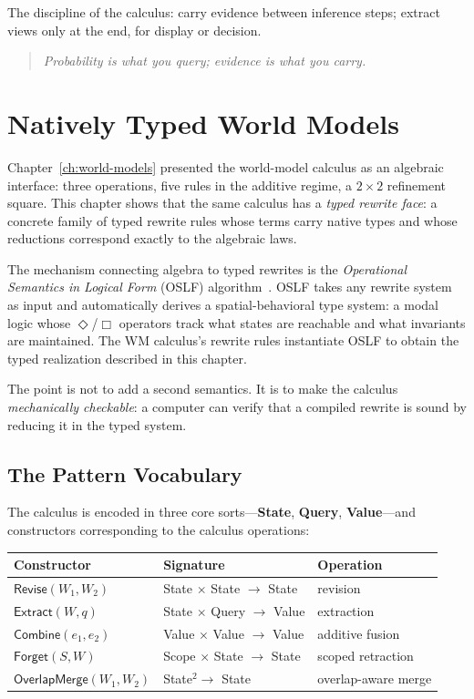 \documentclass[11pt,openany]{report}
\begin{document}
The discipline of the calculus: carry evidence between inference
steps; extract views only at the end, for display or decision.

\begin{quote}
\emph{Probability is what you query; evidence is what you carry.}
\end{quote}


\chapter{Natively Typed World Models}
\label{ch:typed}

Chapter~\ref{ch:world-models} presented the world-model calculus as
an algebraic interface: three operations, five rules in the additive
regime, a $2 \times 2$ refinement square.  This chapter shows that the
same calculus has a \emph{typed rewrite face}: a concrete family of
typed rewrite rules whose terms carry native types and whose reductions
correspond exactly to the algebraic laws.

The mechanism connecting algebra to typed rewrites is the
\emph{Operational Semantics in Logical Form} (OSLF)
algorithm~\cite{MeredithStayOSLF2020,leanOSLF2025}.  OSLF takes any
rewrite system as input and automatically derives a spatial-behavioral
type system: a modal logic whose $\Diamond$/$\Box$ operators track
what states are reachable and what invariants are maintained.  The
WM calculus's rewrite rules instantiate OSLF to obtain the typed
realization described in this chapter.

The point is not to add a second semantics.  It is to make the
calculus \emph{mechanically checkable}: a computer can verify that a
compiled rewrite is sound by reducing it in the typed system.

\section{The Pattern Vocabulary}

The calculus is encoded in three core sorts---\textbf{State},
\textbf{Query}, \textbf{Value}---and constructors corresponding to
the calculus operations:

\medskip
\begin{center}
\begin{tabular}{lll}
\toprule
\textbf{Constructor} & \textbf{Signature} & \textbf{Operation} \\
\midrule
$\mathsf{Revise}(W_1, W_2)$ & State $\times$ State $\to$ State
  & revision \\
$\mathsf{Extract}(W, q)$ & State $\times$ Query $\to$ Value
  & extraction \\
$\mathsf{Combine}(e_1, e_2)$ & Value $\times$ Value $\to$ Value
  & additive fusion \\
$\mathsf{Forget}(S, W)$ & Scope $\times$ State $\to$ State
  & scoped retraction \\
$\mathsf{OverlapMerge}(W_1, W_2)$ & State$^2 \to$ State
  & overlap-aware merge \\
\bottomrule
\end{tabular}
\end{center}
\medskip
\end{document}
